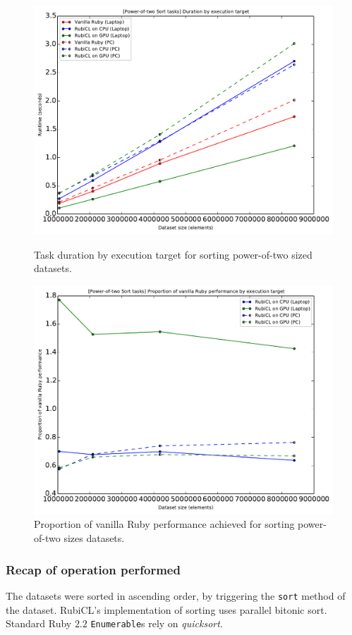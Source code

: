 \begin{figure}[H]
  \centering
  \includegraphics[width=\textwidth]{./graphing/sort_pow2/runtimes.pdf}
  \caption{Task duration by execution target for sorting power-of-two sized datasets.}
  \label{fig:sortpow_task_runtime_g}

  \includegraphics[width=\textwidth]{./graphing/sort_pow2/prop_van.pdf}
  \caption{Proportion of vanilla Ruby performance achieved for sorting power-of-two sizes datasets.}
  \label{fig:sortpow_van_perf_g}

\end{figure}

\subsubsection{Recap of operation performed}
The datasets were sorted in ascending order, by triggering the \verb|sort| method of the dataset.
RubiCL's implementation of sorting uses parallel bitonic sort. Standard Ruby $2.2$ \verb|Enumerable|s rely on \emph{quicksort}.

